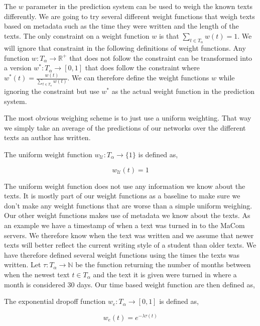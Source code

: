 The $w$ parameter in the prediction system can be used to weigh the known texts
differently. We are going to try several different weight functions that weigh
texts based on metadata such as the time they were written and the length of
the texts. The only constraint on a weight function $w$ is that $\sum_{t \in
T_\alpha} w(t) = 1$. We will ignore that constraint in the following definitions
of weight functions. Any function $w: T_\alpha \rightarrow \mathbb{R}^+$
that does not follow the constraint can be transformed into a version $w^*:
T_\alpha \rightarrow [0,1]$ that does follow the constraint where $w^*(t) =
\frac{w(t)}{\sum_{t \in T_\alpha} w(t)}$. We can therefore define the weight
functions $w$ while ignoring the constraint but use $w^*$ as the actual weight
function in the prediction system.

The most obvious weighing scheme is to just use a uniform weighting. That way
we simply take an average of the predictions of our networks over the different
texts an author has written.

\begin{definition}

    The uniform weight function $w_\mathcal{U}: T_\alpha \rightarrow \{1\}$ is
    defined as,

    \begin{equation}
        w_\mathcal{U}(t) = 1
    \end{equation}

\end{definition}

The uniform weight function does not use any information we know about the
texts. It is mostly part of our weight functions as a baseline to make sure we
don't make any weight functions that are worse than a simple uniform weighing.
Our other weight functions makes use of metadata we know about the texts. As an
example we have a timestamp of when a text was turned in to the MaCom servers.
We therefore know when the text was written and we assume that newer texts will
better reflect the current writing style of a student than older texts. We
have therefore defined several weight functions using the times the texts was
written. Let $\tau: T_\alpha \rightarrow \mathbb{N}$ be the function returning
the number of months between when the newest text $t \in T_\alpha$ and the text
it is given were turned in where a month is considered 30 days. Our time based
weight function are then defined as,

\begin{definition}

    The exponential dropoff function $w_e: T_\alpha \rightarrow [0, 1]$ is
    defined as,

    \begin{equation}
        w_e(t) = e^{-\lambda \tau(t)}
    \end{equation}

\end{definition}

